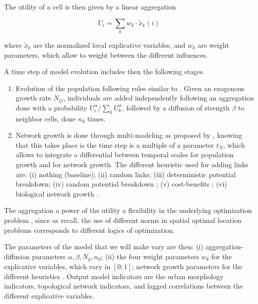 The utility of a cell is then given by a linear aggregation 

\begin{equation}
U_i = \sum_k w_k \cdot \tilde{x}_k(i)
\end{equation}

where $\tilde{x}_k$ are the normalized local explicative variables, and $w_k$ are weight parameters, which allow to weight between the different influences. 


A time step of model evolution includes then the following stages.
\begin{enumerate}
	\item Evolution of the population following rules similar to \cite{2017arXiv170806743R}. Given an exogenous growth rate $N_G$, individuals are added independently following an aggregation done with a probability $U_i^\alpha/\sum_k U_k^\alpha$, followed by a diffusion of strength $\beta$ to neighbor cells, done $n_d$ times.
	\item Network growth is done through multi-modeling as proposed by \cite{raimbault2017modeling} , knowing that this takes place is the time step is a multiple of a parameter $t_N$, which allows to integrate a differential between temporal scales for population growth and for network growth. The different heuristic used for adding links are: (i) nothing (baseline); (ii) random links; (iii) deterministic potential breakdown; (iv) random potential breakdown \citep{schmitt2014modelisation}; (v) cost-benefits \citep{louf2013emergence}; (vi) biological network growth \citep{tero2010rules}.
\end{enumerate}



The  aggregation  a power  of the utility  a flexibility in the underlying optimization problem , since as \cite{josselin2013revisiting} recall, the use of different norms in spatial optimal location problems corresponds to different logics of optimization.



The parameters of the model that we will make vary are then: (i) aggregation-diffusion parameters $\alpha,\beta,N_g,n_d$; (ii) the four weight parameters $w_k$ for the explicative variables, which vary in $[0;1]$; network growth parameters for the different heuristics . Output model indicators are the urban morphology indicators, topological network indicators, and lagged correlations between the different explicative variables.


